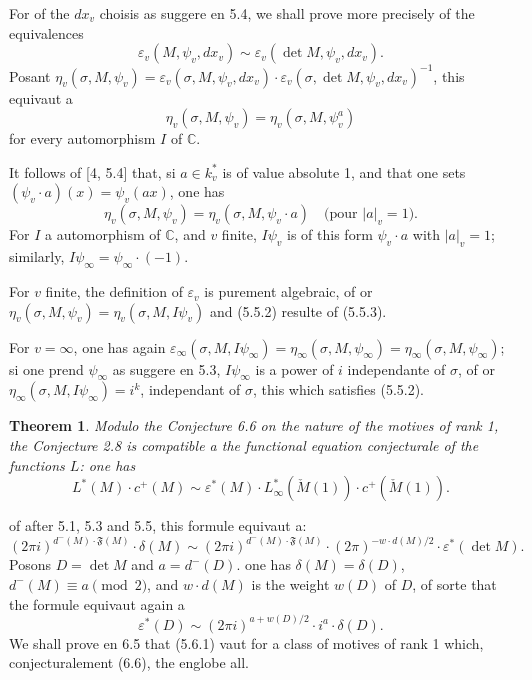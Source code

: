 \documentclass[12pt,a4paper]{article}
\theoremstyle{plain}
\newtheorem{theorem}{Theorem}[section]
\theoremstyle{definition}
\theoremstyle{remark}
\newcommand{\C}{\mathbb{C}}
\begin{document}
For of the $dx_v$ choisis as suggere en 5.4, we shall prove more precisely
of the equivalences
\begin{equation}\label{eq:5.5.1}
\varepsilon_v(M, \psi_v, dx_v) \sim \varepsilon_v(\det M, \psi_v, dx_v).
\end{equation}
Posant $\eta_v(\sigma, M, \psi_v) = \varepsilon_v(\sigma, M, \psi_v, dx_v) \cdot \varepsilon_v(\sigma, \det M, \psi_v, dx_v)^{-1}$,
this equivaut a
\begin{equation}\label{eq:5.5.2}
\eta_v(\sigma, M, \psi_v) = \eta_v(\sigma, M, \psi_v^a)
\end{equation}
for every automorphism $I$ of $\C$.

It follows of [4, 5.4] that, si $a \in k_v^*$ is of value absolute 1, and that one sets
$(\psi_v \cdot a)(x) = \psi_v(ax)$, one has
\begin{equation}\label{eq:5.5.3}
\eta_v(\sigma, M, \psi_v) = \eta_v(\sigma, M, \psi_v \cdot a) \quad \text{(pour } |a|_v = 1\text{).}
\end{equation}
For $I$ a automorphism of $\C$, and $v$ finite, $I \psi_v$ is of this form $\psi_v \cdot a$
with $|a|_v = 1$; similarly, $I \psi_\infty = \psi_\infty \cdot (-1)$.

For $v$ finite, the definition of $\varepsilon_v$ is purement algebraic, of or
$\eta_v(\sigma, M, \psi_v) = \eta_v(\sigma, M, I \psi_v)$ and (5.5.2) resulte of (5.5.3).

For $v = \infty$, one has again $\varepsilon_\infty(\sigma, M, I \psi_\infty) = \eta_\infty(\sigma, M, \psi_\infty) =
\eta_\infty(\sigma, M, \psi_\infty)$; si one prend $\psi_\infty$ as suggere en 5.3, $I \psi_\infty$ is a
power of $i$ independante of $\sigma$, of or $\eta_\infty(\sigma, M, I \psi_\infty) = i^k$, independant of
$\sigma$, this which satisfies (5.5.2).

\begin{theorem}\label{thm:5.6}
Modulo the Conjecture 6.6 on the nature of the motives of rank 1, the Conjecture 2.8
is compatible a the functional equation conjecturale of the functions $L$: one has
\[
L^*(M) \cdot c^+(M) \sim \varepsilon^*(M) \cdot L^*_\infty(\check{M}(1)) \cdot c^+(\check{M}(1)).
\]
\end{theorem}

of after 5.1, 5.3 and 5.5, this formule equivaut a:
\[
(2\pi i)^{d^-(M) \cdot \mathfrak{F}(M)} \cdot \delta(M) \sim (2\pi i)^{d^-(M) \cdot \mathfrak{F}(M)} \cdot (2\pi)^{-w \cdot d(M)/2} \cdot \varepsilon^*(\det M).
\]
Posons $D = \det M$ and $a = d^-(D)$. one has $\delta(M) = \delta(D)$, $d^-(M) \equiv a \pmod 2$,
and $w \cdot d(M)$ is the weight $w(D)$ of $D$, of sorte that the formule equivaut again a
\begin{equation}\label{eq:5.6.1}
\varepsilon^*(D) \sim (2\pi i)^{a + w(D)/2} \cdot i^a \cdot \delta(D).
\end{equation}
We shall prove en 6.5 that (5.6.1) vaut for a class of motives of rank 1 which,
conjecturalement (6.6), the englobe all.
\end{document}
